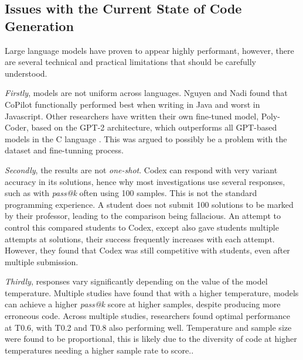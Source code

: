 \documentclass[manuscript,screen,review,sigconf]{acmart}
\begin{document}
\subsection{Issues with the Current State of Code Generation}
 Large language models have proven to appear highly performant, however, there are several technical and practical limitations that should be carefully understood.

\textit{Firstly}, models are not uniform across languages. Nguyen and Nadi \cite{CopilotSuggestionsEval} found that CoPilot functionally performed best when writing in Java and worst in Javascript. Other researchers have written their own fine-tuned model, Poly-Coder, based on the GPT-2 architecture, which outperforms all GPT-based models in the C language \cite{SysEvaOfLLMofCode}. This was argued to possibly be a problem with the dataset and fine-tunning process.

\textit{Secondly}, the results are not \textit{one-shot}. Codex can respond with very variant accuracy in its solutions, hence why most investigations use several responses, such as with \textit{pass@k} often using 100 samples. This is not the standard programming experience. A student does not submit 100 solutions to be marked by their professor, leading to the comparison being fallacious. An attempt to control this compared students to Codex, except also gave students multiple attempts at solutions, their success frequently increases with each attempt. However, they found that Codex was still competitive with students, even after
 multiple submission\cite{Codex_CS1_CS2_Test}.

\textit{Thirdly}, responses vary significantly depending on the value of the model temperature. Multiple studies have found that with a higher temperature, models can achieve a higher \textit{pass@k} score at higher samples, despite producing more erroneous code. Across multiple studies, researchers found optimal performance at T0.6, with T0.2 and T0.8 also performing well. Temperature and sample size were found to be proportional, this is likely due to the diversity of code at higher temperatures needing a higher sample rate to score.\cite{stackOVerflowAndTemperature, SysEvaOfLLMofCode, CodexRelPaper}.
\end{document}
